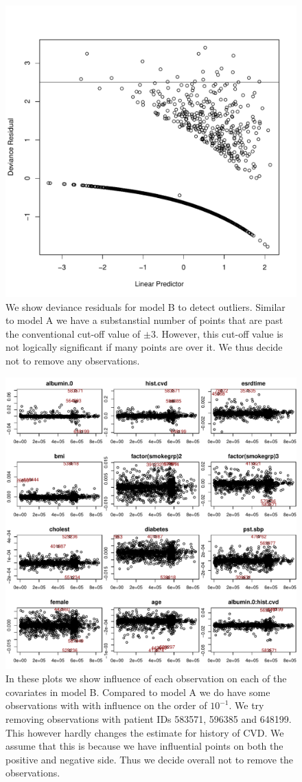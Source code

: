 \documentclass[paper=a4, fontsize=11pt]{scrartcl} %
\numberwithin{equation}{section} %
\numberwithin{figure}{section} %
\numberwithin{table}{section} %
\begin{document}
\begin{figure}[H]
\centering
\includegraphics[width=.5\textwidth]{plots/modelb_diag.pdf}
\caption{We show deviance residuals for model B to detect outliers. Similar to model A we have a substanstial number of points that are past the conventional cut-off value of $\pm 3$. However, this cut-off value is not logically significant if many points are over it. We thus decide not to remove any observations.}
\label{fig:modelb_diag}
\end{figure}

\begin{figure}[H]
\centering
\includegraphics[width=.8\textwidth]{plots/modelb_dfbeta.pdf}
\caption{In these plots we show influence of each observation on each of the covariates in model B. Compared to model A we do have some observations with with influence on the order of $10^{-1}$. We try removing observations with patient IDs 583571, 596385 and 648199. This however hardly changes the estimate for history of CVD. We assume that this is because we have influential points on both the positive and negative side. Thus we decide overall not to remove the observations.}
\label{fig:modelb_dfbeta}
\end{figure}
\end{document}
